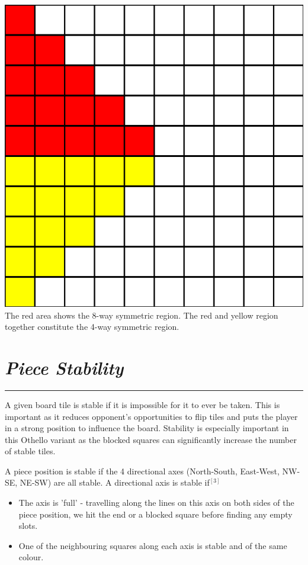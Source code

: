 \documentclass[10pt]{report}
\begin{document}
\begin{multicols}{2}
\begin{center}
\includegraphics[scale=0.25]{symmetries.png}\\
The red area shows the 8-way symmetric region. The red and yellow region together constitute the 4-way symmetric region.
\end{center}
\section*{\emph{\textmd{Piece Stability}}}
\hrule

A given board tile is stable if it is impossible for it to ever be taken. This is important as it reduces opponent's opportunities to flip tiles and puts the player in a strong position to influence the board. Stability is especially important in this Othello variant as the blocked squares can significantly increase the number of stable tiles. 

A piece position is stable if the 4 directional axes (North-South, East-West, NW-SE, NE-SW) are all stable. A directional axis is stable if$^{[3]}$
    \begin{itemize}
\item The axis is 'full' - travelling along the lines on this axis on both sides of the piece position, we hit the end or a blocked square before finding any empty slots.
\item One of the neighbouring squares along each axis is stable and of the same colour.
\end{itemize}


\end{multicols}
\end{document}
